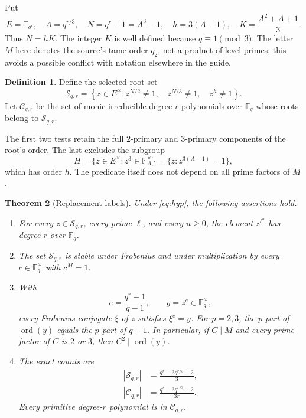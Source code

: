 \documentclass[11pt,a4paper]{article}
\newtheorem{theorem}{Theorem}[section]
\theoremstyle{definition}
\newtheorem{definition}[theorem]{Definition}
\theoremstyle{remark}
\newcommand{\F}{\mathbb F}
\newcommand{\ord}{\operatorname{ord}}
\newcommand{\good}{\mathcal S}
\newcommand{\labels}{\mathcal C}
\begin{document}
Put
\begin{equation}
 E=\F_{q^r},\quad
 A=q^{r/3},\quad
 N=q^r-1=A^3-1,\quad
 h=3(A-1),\quad
 K=\frac{A^2+A+1}{3}.
 \label{eq:defs}
\end{equation}
Thus \(N=hK\). The integer \(K\) is well defined because \(q\equiv1\pmod3\).
The letter \(M\) here denotes the source's tame order \(q_2\), not a product of
level primes; this avoids a possible conflict with notation elsewhere in the guide.

\begin{definition}
Define the selected-root set
\begin{equation}
 \good_{q,r}=
 \left\{z\in E^\times:
      z^{N/2}\ne1,\quad z^{N/3}\ne1,\quad z^h\ne1
 \right\}.
 \label{eq:selection}
\end{equation}
Let \(\labels_{q,r}\) be the set of monic irreducible degree-\(r\) polynomials
over \(\F_q\) whose roots belong to \(\good_{q,r}\).
\end{definition}

The first two tests retain the full \(2\)-primary and \(3\)-primary components of
the root's order. The last excludes the subgroup
\[
 H=\{z\in E^\times:z^3\in\F_A^\times\}
   =\{z:z^{3(A-1)}=1\},
\]
which has order \(h\). The predicate itself does not depend on all prime factors
of \(M\).

\begin{theorem}[Replacement labels]
\label{thm:main}
Under \eqref{eq:hyp}, the following assertions hold.
\begin{enumerate}[label=(\alph*)]
\item For every \(z\in\good_{q,r}\), every prime \(\ell\), and every \(u\ge0\),
the element \(z^{\ell^u}\) has degree \(r\) over \(\F_q\).
\item The set \(\good_{q,r}\) is stable under Frobenius and under multiplication
by every \(c\in\F_q^\times\) with \(c^M=1\).
\item With
\[
             e=\frac{q^r-1}{q-1},\qquad y=z^e\in\F_q^\times,
\]
every Frobenius conjugate \(\xi\) of \(z\) satisfies \(\xi^e=y\).
For \(p=2,3\), the \(p\)-part of \(\ord(y)\) equals the \(p\)-part of \(q-1\).
In particular, if \(C\mid M\) and every prime factor of \(C\) is \(2\) or \(3\),
then \(C^2\mid\ord(y)\).
\item The exact counts are
\begin{align}
    |\good_{q,r}|&=\frac{q^r-3q^{r/3}+2}{3},\label{eq:rootcount}\\
    |\labels_{q,r}|&=\frac{q^r-3q^{r/3}+2}{3r}.\label{eq:labelcount}
\end{align}
Every primitive degree-\(r\) polynomial is in \(\labels_{q,r}\).
\end{enumerate}
\end{theorem}
\end{document}
